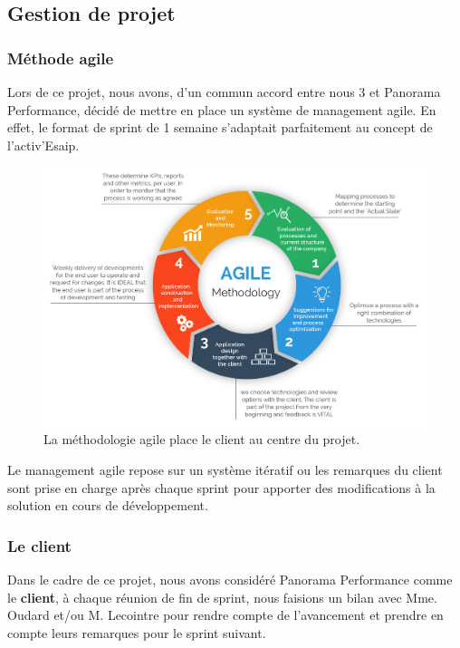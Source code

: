 \subsection{Gestion de projet}

\subsubsection*{Méthode agile}

Lors de ce projet, nous avons, d'un commun accord entre nous 3 et Panorama Performance, décidé de mettre en place un système de management agile.\cite{Atlassian} En effet, le format de sprint\cite{Sprint} de 1 semaine s'adaptait parfaitement au concept de l'activ'Esaip.\\ 
\begin{figure}[h!]
    \centering
    \includegraphics[scale=0.25]{img/agile.jpg}
    \caption{La méthodologie agile place le client au centre du projet.}
    \label{fig:Agile}
\end{figure}

Le management agile repose sur un système itératif ou les remarques du client sont prise en charge après chaque sprint pour apporter des modifications à la solution en cours de développement. 

\subsubsection*{Le client}
Dans le cadre de ce projet, nous avons considéré Panorama Performance comme le \textbf{client}, à chaque réunion de fin de sprint, nous faisions un bilan avec Mme. Oudard et/ou M. Lecointre pour rendre compte de l'avancement et prendre en compte leurs remarques pour le sprint suivant.\\

